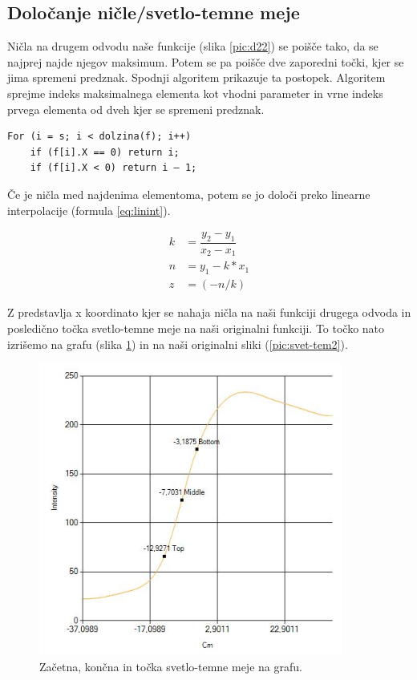 \documentclass[oneside, a4paper, 12pt]{book}
\begin{document}
\subsection{Določanje ničle/svetlo-temne meje}

Ničla na drugem odvodu naše funkcije (slika \ref{pic:d22}) se poišče tako, da se najprej najde njegov maksimum. Potem  se pa poišče dve zaporedni točki, kjer se jima spremeni predznak. Spodnji algoritem prikazuje ta postopek. Algoritem sprejme indeks maksimalnega elementa kot vhodni parameter in vrne indeks prvega elementa od dveh kjer se spremeni predznak.

\begin{verbatim}
For (i = s; i < dolzina(f); i++)
    if (f[i].X == 0) return i;
    if (f[i].X < 0) return i – 1;
\end{verbatim}

Če je ničla med najdenima elementoma, potem se jo določi preko linearne interpolacije (formula \ref{eq:linint}).

\begin{align}
k &= \dfrac{y_2-y_1}{x_2-x_1}  \nonumber\\
n &= y_1-k*x_1 \nonumber \\
z &= (-n/k) \label{eq:linint}
\end{align} 

Z predstavlja x koordinato kjer se nahaja ničla na naši funkciji drugega odvoda in posledično točka svetlo-temne meje na naši originalni funkciji. To točko nato izrišemo na grafu (slika \ref{pic:svet-tem}) in na naši originalni sliki (\ref{pic:svet-tem2}).

\begin{figure}
\begin{center}
\includegraphics[width=10cm]{slike/svetlo-temna-meja.jpg}
\end{center}
\caption{Začetna, končna in točka svetlo-temne meje na grafu.}
\label{pic:svet-tem}
\end{figure}
\end{document}
